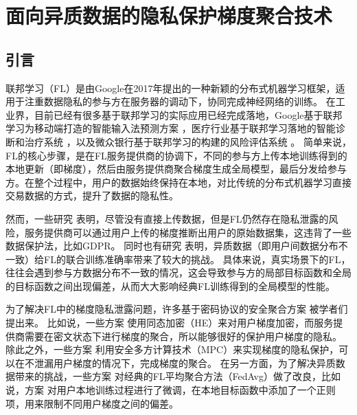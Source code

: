\chapter{面向异质数据的隐私保护梯度聚合技术}

\section{引言}
联邦学习\cite{mcmahan2017communication}（FL）是由Google在2017年提出的一种新颖的分布式机器学习框架，适用于注重数据隐私的参与方在服务器的调动下，协同完成神经网络的训练。
在工业界，目前已经有很多基于联邦学习的实际应用已经完成落地，Google基于联邦学习为移动端打造的智能输入法预测方案 \cite{hard2018federated}，医疗行业基于联邦学习落地的智能诊断和治疗系统 \cite{li2020deepfed}，以及微众银行基于联邦学习的构建的风险评估系统 \cite{DBLP:conf/ndss/CaoF0G21}。 
简单来说，FL的核心步骤，是在FL服务提供商的协调下，不同的参与方上传本地训练得到的本地更新（即梯度），然后由服务提供商聚合梯度生成全局模型，最后分发给参与方。在整个过程中，用户的数据始终保持在本地，对比传统的分布式机器学习直接交易数据的方式，提升了数据的隐私性。

然而，一些研究 \cite{geiping2020inverting,zhu2019deep,gao2021privacy} 表明，尽管没有直接上传数据，但是FL仍然存在隐私泄露的风险，服务提供商可以通过用户上传的梯度推断出用户的原始数据集，这违背了一些数据保护法，比如GDPR。
同时也有研究 \cite{zhao2018federated, tuor2021overcoming, yoshida2019hybrid}表明，异质数据（即用户间数据分布不一致）给FL的联合训练准确率带来了较大的挑战。
具体来说，真实场景下的FL，往往会遇到参与方数据分布不一致的情况，这会导致参与方的局部目标函数和全局的目标函数之间出现偏差，从而大大影响经典FL训练得到的全局模型的性能。


为了解决FL中的梯度隐私泄露问题，许多基于密码协议的安全聚合方案 \cite{liu2021privacy, aono2017privacy, zhang2020batchcrypt, dong2021flod, hao2021efficient} 被学者们提出来。
比如说，一些方案 \cite{liu2021privacy, aono2017privacy, zhang2020batchcrypt} 使用同态加密（HE）来对用户梯度加密，而服务提供商需要在密文状态下进行梯度的聚合，所以能够很好的保护用户梯度的隐私。
除此之外，一些方案 \cite{hao2021efficient, dong2021flod} 利用安全多方计算技术（MPC）来实现梯度的隐私保护，可以在不泄漏用户梯度的情况下，完成梯度的聚合。
在另一方面，为了解决异质数据带来的挑战，一些方案 \cite{li2020federated, gao2022feddc, ghosh2020efficient, briggs2020federated}对经典的FL平均聚合方法（FedAvg\cite{mcmahan2017communication}）做了改良，比如说，方案 \cite{li2020federated} 对用户本地训练过程进行了微调，在本地目标函数中添加了一个正则项，用来限制不同用户梯度之间的偏差。

